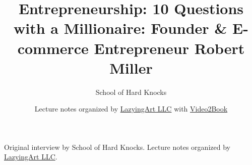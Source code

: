 \documentclass[11pt,oneside]{book}
\begin{document}
\frontmatter
\title{Entrepreneurship: 10 Questions with a Millionaire: Founder \& E-commerce Entrepreneur Robert Miller}
\author{School of Hard Knocks}
\date{Lecture notes organized by \href{https://lazying.art}{LazyingArt LLC} with \href{https://github.com/lachlanchen/Video2Book}{Video2Book}}
\maketitle
\begin{center}
\small Original interview by School of Hard Knocks. Lecture notes organized by \href{https://lazying.art}{LazyingArt LLC}.
\end{center}
\clearpage
\mainmatter

\end{document}
